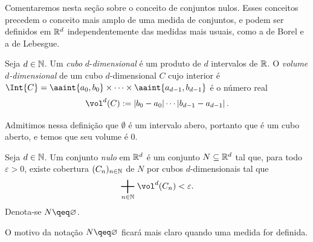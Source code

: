 Comentaremos nesta seção sobre o conceito de conjuntos nulos. Esses conceitos precedem o conceito mais amplo de uma medida de conjuntos, e podem ser definidos em $\mathbb{R}^d$ independentemente das medidas mais usuais, como a de Borel e a de Lebesgue.

\begin{defi}
Seja $d \in \mathbb{N}$. Um \emph{cubo} $d$-\emph{dimensional} é um produto de $d$ intervalos de $\mathbb{R}$. O \emph{volume $d$-dimensional} de um cubo $d$-dimensional $C$ cujo interior é $\Int{C} = \aaint{a_0,b_0} \times \cdots \times \aaint{a_{d-1},b_{d-1}}$ é o número real
	\begin{equation*}
	\vol^d(C) := \abs{b_0 - a_0}\cdots\abs{b_{d-1} - a_{d-1}}.
	\end{equation*}
\end{defi}

Admitimos nessa definição que $\emptyset$ é um intervalo abero, portanto que é um cubo aberto, e temos que seu volume é $0$.

\begin{defi}
Seja $d \in \mathbb{N}$. Um conjunto \emph{nulo} em $\mathbb{R}^d$ é um conjunto $N \subseteq \mathbb{R}^d$ tal que, para todo $\varepsilon>0$, existe cobertura $(C_n)_{n \in \mathbb{N}}$ de $N$ por cubos $d$-dimensionais tal que
	\begin{equation*}
	\sum_{n \in \N} \vol^d(C_n) < \varepsilon.
	\end{equation*}
Denota-se $N \qeq \emptyset$.
\end{defi}

O motivo da notação $N \qeq \emptyset$ ficará mais claro quando uma medida for definida.


